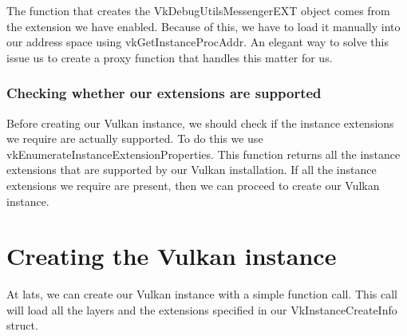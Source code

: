 \begin{minipage}{\linewidth}{\noindent}
    
\end{minipage}

The function that creates the VkDebugUtilsMessengerEXT object comes from the
extension we have enabled.
Because of this, we have to load it manually into our address space using
vkGetInstanceProcAddr.
An elegant way to solve this issue us to create a proxy function that handles
this matter for us.

\begin{minipage}{\linewidth}{\noindent}
    
\end{minipage}

\subsubsection{Checking whether our extensions are supported}

Before creating our Vulkan instance, we should check if the instance extensions
we require are actually supported.
To do this we use vkEnumerateInstanceExtensionProperties.
This function returns all the instance extensions that are supported by our
Vulkan installation.
If all the instance extensions we require are present, then we can proceed to
create our Vulkan instance.

\section{Creating the Vulkan instance}

At lats, we can create our Vulkan instance with a simple function call.
This call will load all the layers and the extensions specified in our
VkInstanceCreateInfo struct.

\begin{minipage}{\linewidth}{\noindent}
    
\end{minipage}
